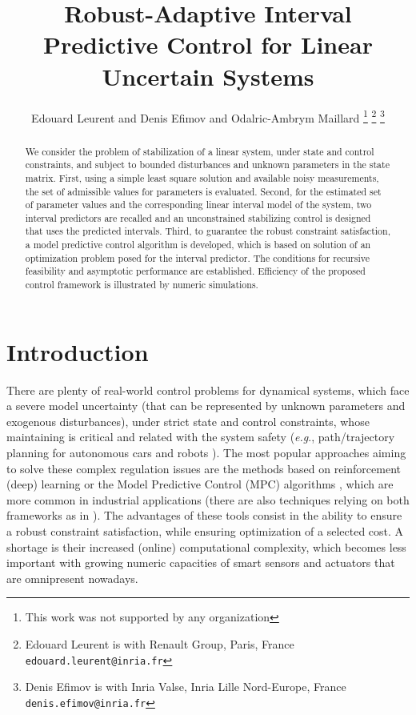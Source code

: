 \documentclass[letterpaper, 10 pt, conference]{ieeeconf}  %
\title{\LARGE \bf
	Robust-Adaptive Interval Predictive Control for Linear Uncertain Systems
}
\author{Edouard Leurent and Denis Efimov and Odalric-Ambrym Maillard%
	\thanks{This work was not supported by any organization}%
	\thanks{Edouard Leurent is with Renault Group, Paris, France
		{\tt\small edouard.leurent@inria.fr}}%
	\thanks{Denis Efimov is with Inria Valse, Inria Lille Nord-Europe, France
		{\tt\small denis.efimov@inria.fr}}%
}
\begin{document}
\maketitle
\thispagestyle{empty}
\pagestyle{empty}

\begin{abstract}
We consider the problem of stabilization of a linear system, under
state and control constraints, and subject to bounded disturbances
and unknown parameters in the state matrix. First, using a simple
least square solution and available noisy measurements, the set of
admissible values for parameters is evaluated. Second, for the estimated
set of parameter values and the corresponding linear interval model
of the system, two interval predictors are recalled and an unconstrained
stabilizing control is designed that uses the predicted intervals.
Third, to guarantee the robust constraint satisfaction, a model predictive
control algorithm is developed, which is based on solution of an optimization
problem posed for the interval predictor. The conditions for recursive
feasibility and asymptotic performance are established. Efficiency
of the proposed control framework is illustrated by numeric simulations.
\end{abstract}

\section{Introduction}

There are plenty of real-world control problems for dynamical systems,
which face a severe model uncertainty (that can be represented by
unknown parameters and exogenous disturbances), under strict state
and control constraints, whose maintaining is critical and related
with the system safety (\emph{e.g}., path/trajectory planning for
autonomous cars and robots \cite{leurent2019interval,Lenz2015}).
The most popular approaches aiming to solve these complex regulation
issues are the methods based on reinforcement (deep) learning \cite{mnih2015humanlevel,Silver1140}
or the Model Predictive Control (MPC) algorithms \cite{Basar1996,MPC1,MPC:Tube2},
which are more common in industrial applications (there are also techniques
relying on both frameworks as in \cite{Lenz2015,Dean2018}). The advantages
of these tools consist in the ability to ensure a robust constraint
satisfaction, while ensuring optimization of a selected cost. A shortage
is their increased (online) computational complexity, which becomes
less important with growing numeric capacities of smart sensors and
actuators that are omnipresent nowadays.
\end{document}
